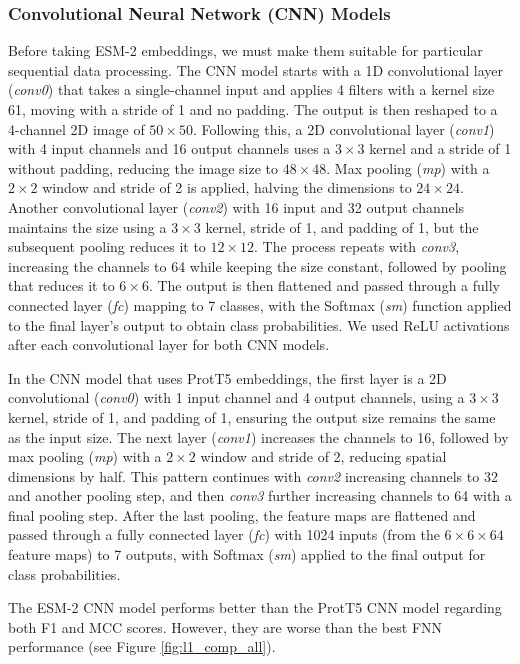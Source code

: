 \documentclass{bioinfo}
\begin{document}
\subsubsection{Convolutional Neural Network (CNN) Models}
Before taking ESM-2 embeddings, we must make them suitable for particular sequential data processing.
The CNN model starts with a 1D convolutional layer (\textit{conv0}) that takes a single-channel input and applies 4
filters with a kernel size 61, moving with a stride of 1 and no padding.
The output is then reshaped to a 4-channel 2D image of  $50\times50$. Following this, a 2D convolutional layer (\textit{conv1}) with 4 input 
channels and 16 output channels uses a $3\times3$ kernel and a stride of 1 without padding, reducing the image size to $48\times48$. 
Max pooling (\textit{mp}) with a $2\times2$ window and stride of 2 is applied, halving the dimensions to $24\times24$. 
Another convolutional layer (\textit{conv2}) with 16 input and 32 output channels maintains the size using a $3\times3$ kernel, 
stride of 1, and padding of 1, but the subsequent pooling reduces it to $12\times12$. 
The process repeats with \textit{conv3}, increasing the channels to 64 while keeping the size constant, 
followed by pooling that reduces it to $6\times6$. The output is then flattened and passed through a fully connected 
layer (\textit{fc}) mapping to 7 classes, with the Softmax (\textit{sm}) function applied to the final layer's output to obtain class probabilities. 
We used ReLU activations after each convolutional layer for both CNN models.

In the CNN model that uses ProtT5 embeddings, the first layer is a 2D convolutional (\textit{conv0}) with 1 input channel and 
4 output channels, using a $3\times3$ kernel, stride of 1, and padding of 1, ensuring the output size remains the same as the input 
size. The next layer (\textit{conv1}) increases the channels to 16, followed by max pooling (\textit{mp}) with a $2\times2$ window and stride of 2,
reducing spatial dimensions by half. This pattern continues with \textit{conv2} increasing channels to 32 and another pooling step,
and then \textit{conv3} further increasing channels to 64 with a final pooling step. After the last pooling, 
the feature maps are flattened and passed through a fully connected layer (\textit{fc}) with 1024 inputs 
(from the $6\times6\times64$ feature maps) to 7 outputs, with Softmax (\textit{sm}) applied to the final output for class 
probabilities.

The ESM-2 CNN model performs better than the ProtT5 CNN model regarding both F1 and MCC scores. 
However, they are worse than the best FNN performance (see Figure \ref{fig:l1_comp_all}).
\end{document}
